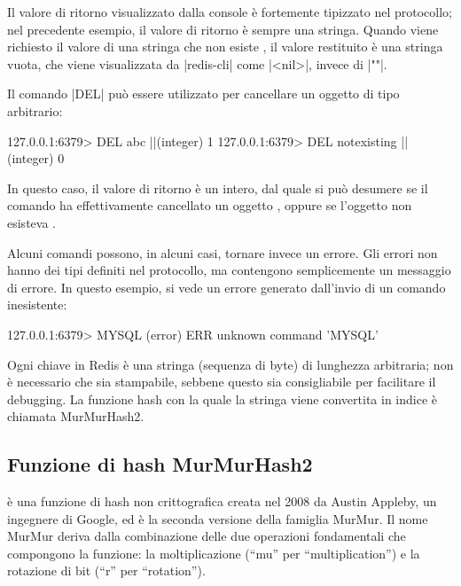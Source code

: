 Il valore di ritorno visualizzato dalla console è fortemente tipizzato nel protocollo;
nel precedente esempio, il valore di ritorno è sempre una stringa. Quando viene
richiesto il valore di una stringa che non esiste , il valore restituito
è una stringa vuota, che viene visualizzata da \cverb|redis-cli| come \cverb|<nil>|,
invece di \cverb|""|.

Il comando \cverb|DEL| può essere utilizzato per cancellare un oggetto di tipo
arbitrario:

\begin{commentedsource}[style=redis]
127.0.0.1:6379> DEL abc
|\lnote|(integer) 1
127.0.0.1:6379> DEL notexisting
|\lnote|(integer) 0
\end{commentedsource}

In questo caso, il valore di ritorno è un intero, dal quale si può desumere se il comando ha
effettivamente cancellato un oggetto , oppure se l'oggetto non esisteva .

Alcuni comandi possono, in alcuni casi, tornare invece un errore. Gli errori non hanno dei
tipi definiti nel protocollo, ma contengono semplicemente un messaggio di errore. In questo
esempio, si vede un errore generato dall'invio di un comando inesistente:

\begin{commentedsource}[style=redis]
127.0.0.1:6379> MYSQL
(error) ERR unknown command 'MYSQL'
\end{commentedsource}

Ogni chiave in Redis è una stringa (sequenza di byte) di lunghezza arbitraria; non è
necessario che sia stampabile, sebbene questo sia consigliabile per facilitare il
debugging. La funzione hash con la quale la stringa viene convertita in indice è
chiamata MurMurHash2.

\subsection{Funzione di hash MurMurHash2}
\label{sec:redis:murmur}

 è una funzione di hash non
crittografica creata nel 2008 da Austin Appleby, un ingegnere di Google, ed è la seconda versione
della famiglia MurMur. Il nome MurMur deriva dalla combinazione delle due operazioni fondamentali
che compongono la funzione: la moltiplicazione (``mu'' per ``multiplication'') e la rotazione di bit
(``r'' per ``rotation'').

